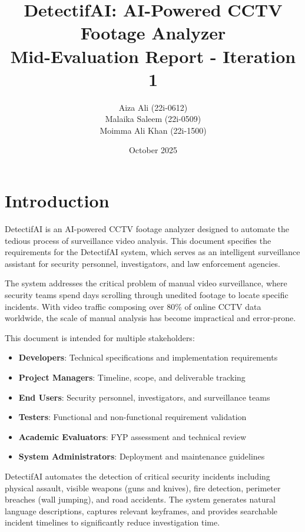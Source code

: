 \documentclass[12pt,a4paper]{article}
\title{DetectifAI: AI-Powered CCTV Footage Analyzer\\
Mid-Evaluation Report - Iteration 1}
\author{Aiza Ali (22i-0612) \\ Malaika Saleem (22i-0509) \\ Moimma Ali Khan (22i-1500)}
\date{October 2025}
\begin{document}
\maketitle

\tableofcontents
\clearpage

\section{Introduction}
\label{sec:introduction}

DetectifAI is an AI-powered CCTV footage analyzer designed to automate the tedious process of surveillance video analysis. This document specifies the requirements for the DetectifAI system, which serves as an intelligent surveillance assistant for security personnel, investigators, and law enforcement agencies.

The system addresses the critical problem of manual video surveillance, where security teams spend days scrolling through unedited footage to locate specific incidents. With video traffic composing over 80\% of online CCTV data worldwide, the scale of manual analysis has become impractical and error-prone.

This document is intended for multiple stakeholders:
\begin{itemize}
    \item \textbf{Developers}: Technical specifications and implementation requirements
    \item \textbf{Project Managers}: Timeline, scope, and deliverable tracking
    \item \textbf{End Users}: Security personnel, investigators, and surveillance teams
    \item \textbf{Testers}: Functional and non-functional requirement validation
    \item \textbf{Academic Evaluators}: FYP assessment and technical review
    \item \textbf{System Administrators}: Deployment and maintenance guidelines
\end{itemize}

DetectifAI automates the detection of critical security incidents including physical assault, visible weapons (guns and knives), fire detection, perimeter breaches (wall jumping), and road accidents. The system generates natural language descriptions, captures relevant keyframes, and provides searchable incident timelines to significantly reduce investigation time.

\clearpage
\end{document}
